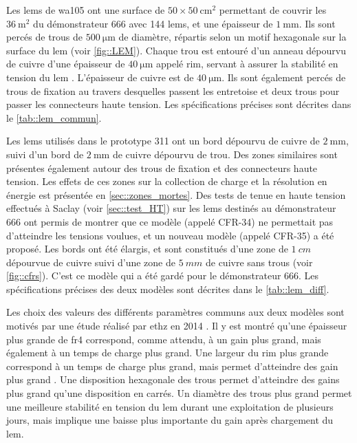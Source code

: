             Les \glspl{lem} de \gls{wa105} ont une surface de $50\times\SI{50}{\centi\meter\squared}$ permettant de couvrir les $\SI{36}{\meter\squared}$ du démonstrateur 666 avec 144 \glspl{lem}, et une épaisseur de $\SI{1}{\milli\meter}$. Ils sont percés de  trous de $\SI{500}{\micro\meter}$ de diamètre, répartis selon un motif hexagonale sur la surface du \gls{lem} (voir \autoref{fig::LEM}). Chaque trou est entouré d'un anneau dépourvu de cuivre d'une épaisseur de $\SI{40}{\micro\meter}$ appelé rim, servant à assurer la stabilité en tension du \gls{lem} \cite{Breskin2008}. L'épaisseur de cuivre est de $\SI{40}{\micro\meter}$. Ils sont également percés de  trous de fixation au travers desquelles passent les entretoise et deux trous pour passer les connecteurs haute tension. Les spécifications précises sont décrites dans le \autoref{tab::lem_commun}.
            
            Les \glspl{lem} utilisés dans le prototype 311 ont un bord dépourvu de cuivre de $\SI{2}{\milli\meter}$, suivi d'un bord de $\SI{2}{\milli\meter}$ de cuivre dépourvu de trou. Des zones similaires sont présentes également autour des trous de fixation et des connecteurs haute tension. Les effets de ces zones sur la collection de charge et la résolution en énergie est présentée en \autoref{sec::zones_mortes}. Des tests de tenue en haute tension effectués à Saclay (voir \autoref{sec::test_HT}) sur les \glspl{lem} destinés au démonstrateur 666 ont permis de montrer que ce modèle (appelé CFR-34) ne permettait pas d'atteindre les tensions voulues, et un nouveau modèle (appelé CFR-35) a été proposé. Les bords ont été élargis, et sont constitués d'une zone de $\SI{1}{cm}$ dépourvue de cuivre suivi d'une zone de $\SI{5}{mm}$ de cuivre sans trous (voir \autoref{fig::cfrs}). C'est ce modèle qui a été gardé pour le démonstrateur 666. Les spécifications précises des deux modèles sont décrites dans le \autoref{tab::lem_diff}.
            
            Les choix des valeurs des différents paramètres communs aux deux modèles sont motivés par une étude réalisé par \gls{ethz} en 2014 \cite{Cantini2014}. Il y est montré qu'une épaisseur plus grande de \gls{fr4} correspond, comme attendu, à un gain plus grand, mais également à un temps de charge plus grand. Une largeur du rim plus grande correspond à un temps de charge plus grand, mais permet d'atteindre des gain plus grand \cite{Breskin2008}. Une disposition hexagonale des trous permet d'atteindre des gains plus grand qu'une disposition en carrés. Un diamètre des trous plus grand permet une meilleure stabilité en tension du \gls{lem} durant une exploitation de plusieurs jours, mais implique une baisse plus importante du gain après chargement du \gls{lem}.
            
